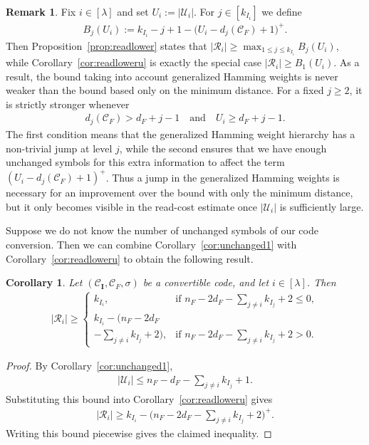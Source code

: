 \documentclass[conference, 10pt]{IEEEtran}
\theoremstyle{plain}
\newtheorem{corollary}[theorem]{Corollary}
\theoremstyle{definition}
\newtheorem{remark}[definition]{Remark}
\newcommand{\mC}{\mathcal{C}}
\newcommand{\mU}{\mathcal{U}}
\newcommand{\mR}{\mathcal{R}}
\begin{document}
\begin{remark}\label{rem:read-ghw-improvement}
Fix $i\in [\lambda]$ and set $U_i:=|\mU_i|$. For $j\in [k_{I_i}]$ we define
\begin{align*}
    B_j(U_i):=k_{I_i}-j+1-\bigl(U_i-d_j(\mC_F)+1\bigr)^+.
\end{align*}
Then Proposition~\ref{prop:readlower} states that $|\mR_i|\ge \max_{1\le j\le k_{I_i}} B_j(U_i)$, while Corollary~\ref{cor:readloweru} is exactly the special case $|\mR_i|\ge B_1(U_i)$. As a result, the bound taking into account generalized Hamming weights is never weaker than the bound based only on the minimum distance. For a fixed $j\ge 2$, it is strictly stronger whenever
\begin{align*}
    d_j(\mC_F)>d_F+j-1 \quad \text{and} \quad U_i\ge d_F+j-1.
\end{align*}
The first condition means that the generalized Hamming weight hierarchy has a non-trivial jump at level $j$, while the second ensures that we have enough unchanged symbols for this extra information to affect the term $(U_i-d_j(\mC_F)+1)^+$. Thus a jump in the generalized Hamming weights is necessary for an improvement over the bound with only the minimum distance, but it only becomes visible in the read-cost estimate once $|\mU_i|$ is sufficiently large.
\end{remark}




Suppose we do not know the number of unchanged symbols of our code conversion. Then we can combine Corollary~\ref{cor:unchanged1} with Corollary~\ref{cor:readloweru} to obtain the following result.


\begin{corollary}\label{cor:readlowergen}
Let $(\mC_{\textbf{I}},\mC_F,\sigma)$ be a convertible code, and let $i\in [\lambda]$. Then
\begin{align*}
|\mR_i|\ge
\begin{cases}
k_{I_i}, & \text{if } n_F-2d_F-\sum_{j\ne i} k_{I_j}+2\le 0,\\[2pt]
k_{I_i}-(n_F-2d_F\\-\sum_{j\ne i} k_{I_j}+2), & \text{if } n_F-2d_F-\sum_{j\ne i} k_{I_j}+2>0.
\end{cases}
\end{align*}
\end{corollary}

\begin{proof}
By Corollary~\ref{cor:unchanged1},
\begin{align*} |\mU_i|\le n_F-d_F-\sum_{j\ne i} k_{I_j}+1. \end{align*}
Substituting this bound into Corollary~\ref{cor:readloweru} gives
\begin{align*} |\mR_i|\ge k_{I_i}-\bigl(n_F-2d_F-\sum_{j\ne i} k_{I_j}+2\bigr)^+. \end{align*}
Writing this bound piecewise gives the claimed inequality.
\end{proof}
\end{document}
